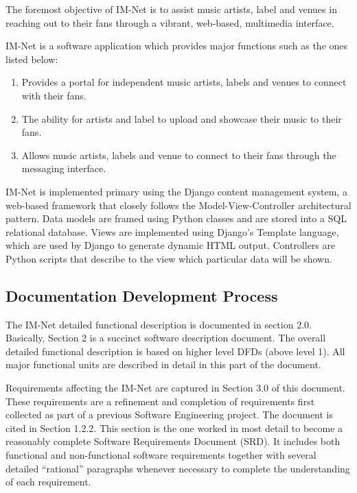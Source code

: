 \documentclass[letterpaper,12pt]{article}
\begin{document}
{The foremost objective of IM-Net is to assist music artists, label and venues in reaching out to their fans through a vibrant, web-based, multimedia interface.

IM-Net is a software application which provides major functions such as the ones listed below:

\begin{enumerate}
\item  Provides a portal for independent music artists, labels and venues to connect with their fans.

\item  The ability for artists and label to upload and showcase their music to their fans.

\item  Allows music artists, labels and venue to connect to their fans through the messaging interface.
\end{enumerate}

IM-Net is implemented primary using the Django content management system, a web-based framework that closely follows the Model-View-Controller architectural pattern. Data models are framed using Python classes and are stored into a SQL relational database. Views are implemented using Django's Template language, which are used by Django to generate dynamic HTML output. Controllers are Python scripts that describe to the view which particular data will be shown. 

\textcolor{subsection}{\subsection{Documentation Development Process}}

The IM-Net detailed functional description is documented in section 2.0. Basically, Section 2 is a succinct software description document. The overall detailed functional description is based on higher level DFDs (above level 1). All major functional units are described in detail in this part of the document.

Requirements affecting the IM-Net are captured in Section 3.0 of this document.  These requirements are a refinement and completion of requirements first collected as part of a previous Software Engineering project. The document is cited in Section 1.2.2. This section is the one worked in most detail to become a reasonably complete Software Requirements Document (SRD). It includes both functional and non-functional software requirements together with several detailed ``rational'' paragraphs whenever necessary to complete the understanding of each requirement.

}
\end{document}
